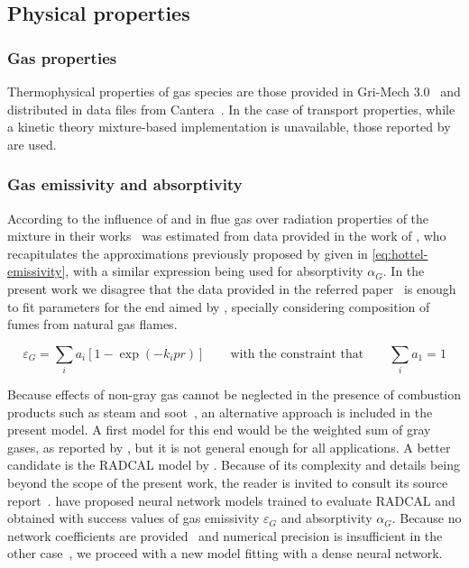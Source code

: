\documentclass[11pt]{paper}
\begin{document}
\subsection{Physical properties}

\subsubsection*{Gas properties}

Thermophysical properties of gas species are those provided in Gri-Mech 3.0~\cite{Smith1999} and distributed in data files from Cantera~\cite{Goodwin2014}. In the case of transport properties, while a kinetic theory mixture-based implementation is unavailable, those reported by \textcite{Mujumdar2006i} are used.

\subsubsection*{Gas emissivity and absorptivity}

According to \textcite{Mujumdar2006i} the influence of  and  in flue gas over radiation properties of the mixture in their works~\cite{Mujumdar2006i,Mujumdar2006ii} was estimated from data provided in the work of \textcite{Gorog1981}, who recapitulates the approximations previously proposed by \textcite{Hottel1967} given in \eqref{eq:hottel-emissivity}, with a similar expression being used for absorptivity $\alpha_{G}$. In the present work we disagree that the data provided in the referred paper~\cite{Gorog1981} is enough to fit parameters for the end aimed by \textcite{Mujumdar2006i}, specially considering composition of fumes from natural gas flames.

\begin{equation}
    \varepsilon_{G}=\sum_i{}a_i\left[1-\exp\left(-k_i{}pr\right)\right]
    \qquad\text{with the constraint that}\qquad
    \sum_i{}a_1=1
    \label{eq:hottel-emissivity}
\end{equation}

Because effects of non-gray gas cannot be neglected in the presence of combustion products such as steam and soot~\cite{Tam2019}, an alternative approach is included in the present model. A first model for this end would be the weighted sum of gray gases, as reported by \textcite{Smith1982}, but it is not general enough for all applications. A better candidate is the {RADCAL} model by \textcite{Grosshandler1993}. Because of its complexity and details being beyond the scope of the present work, the reader is invited to consult its source report~\cite{Grosshandler1993}. \textcite{Tam2019,Yuen2009} have proposed neural network models trained to evaluate {RADCAL} and obtained with success values of gas emissivity $\varepsilon_{G}$ and absorptivity $\alpha_{G}$. Because no network coefficients are provided~\cite{Yuen2009} and numerical precision is insufficient in the other case~\cite{Tam2019}, we proceed with a new model fitting with a dense neural network.
\end{document}
